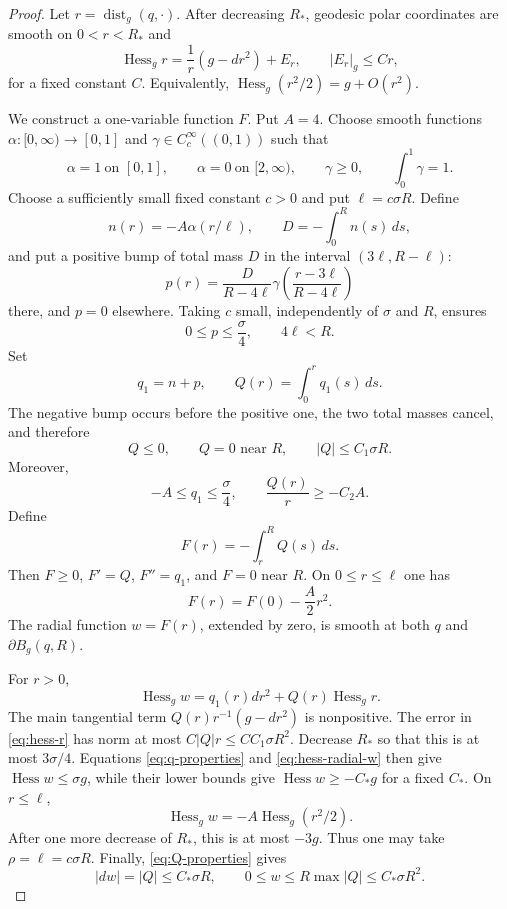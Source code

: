 \documentclass[10pt,a4paper]{amsart}
\newcommand{\Hess}{\operatorname{Hess}}
\newcommand{\dist}{\operatorname{dist}}
\begin{document}
\begin{proof}
Let $r=\dist_g(q,\cdot)$.  After decreasing $R_*$, geodesic polar coordinates are smooth on $0<r<R_*$ and
\begin{equation}\label{eq:hess-r}
 \Hess_g r
 =\frac1r(g-dr^2)+E_r,
 \qquad
 |E_r|_g\le C r,
\end{equation}
for a fixed constant $C$.  Equivalently,
$\Hess_g(r^2/2)=g+O(r^2)$.

We construct a one-variable function $F$.  Put $A=4$.  Choose smooth functions
$\alpha:[0,\infty)\to[0,1]$ and
$\gamma\in C_c^\infty((0,1))$ such that
\[
 \alpha=1\ \text{on }[0,1],\qquad
 \alpha=0\ \text{on }[2,\infty),\qquad
 \gamma\ge0,\qquad \int_0^1\gamma=1.
\]
Choose a sufficiently small fixed constant $c>0$ and put
$\ell=c\sigma R$.  Define
\[
 n(r)=-A\alpha(r/\ell),
 \qquad
 D=-\int_0^R n(s)\,ds,
\]
and put a positive bump of total mass $D$ in the interval
$(3\ell,R-\ell)$:
\[
 p(r)=
 \frac{D}{R-4\ell}
 \gamma\!\left(\frac{r-3\ell}{R-4\ell}\right)
\]
there, and $p=0$ elsewhere.  Taking $c$ small, independently of
$\sigma$ and $R$, ensures
\[
 0\le p\le\frac{\sigma}{4},
 \qquad 4\ell<R.
\]
Set
\[
 q_1=n+p,
 \qquad
 Q(r)=\int_0^r q_1(s)\,ds.
\]
The negative bump occurs before the positive one, the two total masses cancel, and therefore
\begin{equation}\label{eq:Q-properties}
 Q\le0,\qquad Q=0\text{ near }R,
 \qquad |Q|\le C_1\sigma R.
\end{equation}
Moreover,
\begin{equation}\label{eq:q-properties}
 -A\le q_1\le\frac{\sigma}{4},
 \qquad
 \frac{Q(r)}r\ge-C_2A.
\end{equation}
Define
\[
 F(r)=-\int_r^R Q(s)\,ds.
\]
Then $F\ge0$, $F'=Q$, $F''=q_1$, and $F=0$ near $R$.  On
$0\le r\le\ell$ one has
\[
 F(r)=F(0)-\frac A2r^2.
\]
The radial function $w=F(r)$, extended by zero, is smooth at both
$q$ and $\partial B_g(q,R)$.

For $r>0$,
\begin{equation}\label{eq:hess-radial-w}
 \Hess_g w=q_1(r)dr^2+Q(r)\Hess_g r.
\end{equation}
The main tangential term $Q(r)r^{-1}(g-dr^2)$ is nonpositive.  The error in \eqref{eq:hess-r} has norm at most
$C|Q|r\le C C_1\sigma R^2$.  Decrease $R_*$ so that this is at most $3\sigma/4$.  Equations
\eqref{eq:q-properties} and \eqref{eq:hess-radial-w} then give
$\Hess w\le\sigma g$, while their lower bounds give
$\Hess w\ge-C_*g$ for a fixed $C_*$.  On $r\le\ell$,
\[
 \Hess_gw=-A\Hess_g(r^2/2).
\]
After one more decrease of $R_*$, this is at most $-3g$.
Thus one may take $\rho=\ell=c\sigma R$.  Finally,
\eqref{eq:Q-properties} gives
\[
 |dw|=|Q|\le C_*\sigma R,
 \qquad
 0\le w\le R\max|Q|\le C_*\sigma R^2.
\]
\end{proof}
\end{document}
